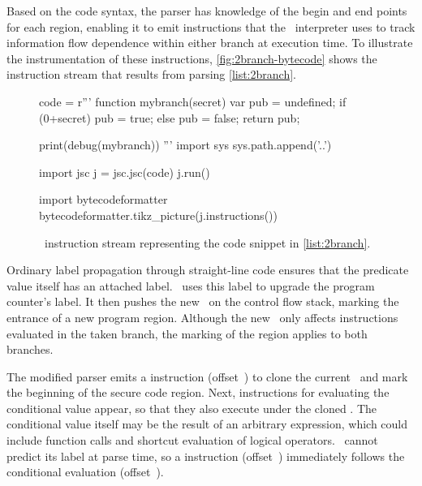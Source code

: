 Based on the code syntax, the parser has knowledge of the begin and end points for each region, enabling it to emit instructions that the \FlowCore\ interpreter uses to track information flow dependence within either branch at execution time.
To illustrate the instrumentation of these instructions, \autoref{fig:2branch-bytecode} shows the instruction stream that results from parsing \autoref{list:2branch}.

\begin{figure}[h]
\begin{python}
code = r'''
function mybranch(secret) {
  var pub = undefined;
  if (0+secret) {
    pub = true;
  } else {
    pub = false;
  }
  return pub;
}

print(debug(mybranch))
'''
import sys
sys.path.append('..')

import jsc
j = jsc.jsc(code)
j.run()

import bytecodeformatter
bytecodeformatter.tikz_picture(j.instructions())
\end{python}
  \caption{\FlowCore\ instruction stream representing the code snippet in \autoref{list:2branch}.}
  \label{fig:2branch-bytecode}
\end{figure}

Ordinary label propagation through straight-line code ensures that the predicate value itself has an attached label.
\FlowCore\ uses this label to upgrade the program counter's label.
It then pushes the new \pclabel\ on the control flow stack, marking the entrance of a new program region.
Although the new \pclabel\ only affects instructions evaluated in the taken branch, the marking of the region applies to both branches.

The modified parser emits a \dup instruction (offset~) to clone the current \pclabel\ and mark the beginning of the secure code region.
Next, instructions for evaluating the conditional value appear, so that they also execute under the cloned \pclabel.
The conditional value itself may be the result of an arbitrary expression, which could include function calls and shortcut evaluation of logical operators.
\FlowCore\ cannot predict its label at parse time, so a \join instruction (offset~) immediately follows the conditional evaluation (offset~).

